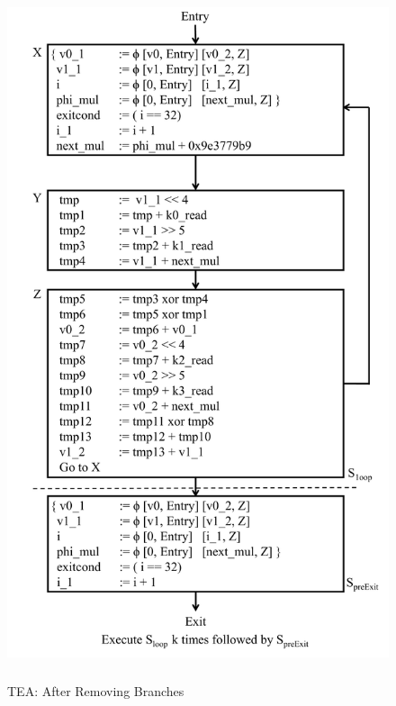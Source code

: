 \begin{figure}[H]
\begin{center}
\includegraphics[height=8in]{fig-proposal/tea-algorithm-after-removing-branches}
\caption{TEA: After Removing Branches}
\label{fig:tea-algorithm-after-removing-branches}
\end{center}
\end{figure}

